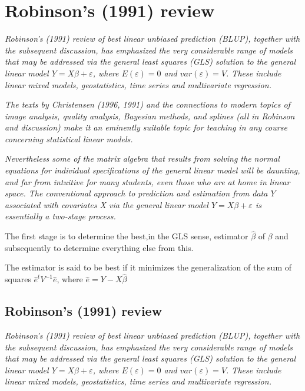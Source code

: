\documentclass[12pt, a4paper]{article}
\begin{document}
\section{Robinson's (1991) review}
\emph{ Robinson's (1991) review of best linear unbiased prediction (BLUP), together with the subsequent discussion, has emphasized the very considerable range of models that may be addressed via the general least squares (GLS) solution to the general linear model $Y = X\beta + \varepsilon$, where $E(\varepsilon) = 0$ and $var(\varepsilon) = V$. These include linear mixed models, geostatistics, time series and multivariate regression.}


\emph{ The texts by Christensen (1996, 1991) and the connections to modern topics of image analysis, quality analysis, Bayesian methods, and splines (all in Robinson and discussion) make it an eminently suitable topic for teaching in any course concerning statistical linear models. }


\emph{Nevertheless some of the matrix algebra that results from solving the normal equations for individual specifications of the general linear model will be daunting, and far from intuitive for many students, even those who are at home in linear space. The conventional approach to prediction and estimation from data $Y$ associated with covariates X via the general linear model $Y = X\beta + \varepsilon$ is essentially a two-stage process.}

The first stage is to determine the best,in the GLS sense, estimator $\hat{\beta}$ of $\beta$ and subsequently to determine everything else from this.

The estimator is said to be best if it minimizes the generalization of the sum of squares $\hat{e}^{t}V^{-1}\hat{e}$, where $\hat{e} = Y- X\hat{\beta}$

\subsection{Robinson's (1991) review}
\emph{ Robinson's (1991) review of best linear unbiased prediction (BLUP), together with the subsequent discussion, has emphasized the very considerable range of models that may be addressed via the general least squares (GLS) solution to the general linear model $Y = X\beta + \varepsilon$, where $E(\varepsilon) = 0$ and $var(\varepsilon) = V$. These include linear mixed models, geostatistics, time series and multivariate regression.}

\smallskip
\end{document}
